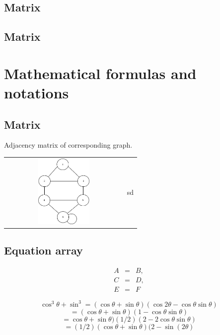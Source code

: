 \documentclass{article}
\begin{document}
\subsection{Matrix}
\subsection{Matrix}

\section{Mathematical formulas and notations} %
\subsection{Matrix}
Adjacency matrix of corresponding graph.


\begin{table}[H]
\centering
\begin{tabular} {l | l}

\includegraphics[width=6cm,height=3.5cm]{flow.jpeg}
   & 
sd
 \\
\end{tabular}
\end{table}



\subsection{Equation array}

\begin{eqnarray}
A&=&B,\\
C&=&D,\\
E&=&F
\end{eqnarray}




\[\cos^3\theta+\sin^3=(\cos\theta+\sin\theta)(\cos2\theta−\cos\theta\sin\theta)\]
\[=(\cos\theta+\sin\theta)(1−\cos\theta\sin\theta)\]
\[=\cos\theta+\sin\theta)(1/2)(2−2\cos\theta\sin\theta)\]
\[=(1/2)(\cos\theta+\sin\theta)(2−\sin(2\theta)\]
\\
\end{document}
